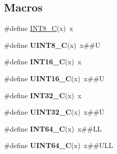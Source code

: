 \subsection*{Macros}
\begin{DoxyCompactItemize}
\item 
\#define \hyperlink{group___b_m_m150_ga1eaa7db37089dcdfb60227725c9c1585}{I\+N\+T8\+\_\+C}(x)~x
\item 
\mbox{\label{group___b_m_m150_gacd2aa09844a8a245cf7fdbb808e215e5}} 
\#define {\bfseries U\+I\+N\+T8\+\_\+C}(x)~x\#\#U
\item 
\mbox{\label{group___b_m_m150_ga838b261fec725cb0f5d5b6769d3521e7}} 
\#define {\bfseries I\+N\+T16\+\_\+C}(x)~x
\item 
\mbox{\label{group___b_m_m150_ga1cb39a2cfaf899fd38730c7637807708}} 
\#define {\bfseries U\+I\+N\+T16\+\_\+C}(x)~x\#\#U
\item 
\mbox{\label{group___b_m_m150_gad78650fb7726f4e99205406569ef403d}} 
\#define {\bfseries I\+N\+T32\+\_\+C}(x)~x
\item 
\mbox{\label{group___b_m_m150_ga2451a7ede7ebd810357f1503e9898ea6}} 
\#define {\bfseries U\+I\+N\+T32\+\_\+C}(x)~x\#\#U
\item 
\mbox{\label{group___b_m_m150_ga93d102802b35d3b8abae9bbe7f0fed75}} 
\#define {\bfseries I\+N\+T64\+\_\+C}(x)~x\#\#LL
\item 
\mbox{\label{group___b_m_m150_ga134ae84400d184ed2570e3270d5472c2}} 
\#define {\bfseries U\+I\+N\+T64\+\_\+C}(x)~x\#\#U\+LL
\end{DoxyCompactItemize}
